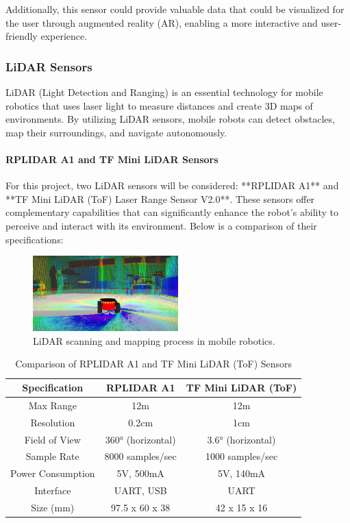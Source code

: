 Additionally, this sensor could provide valuable data that could be visualized for the user through augmented reality (AR), enabling a more interactive and user-friendly experience.

\subsubsection{LiDAR Sensors}
LiDAR (Light Detection and Ranging) is an essential technology for mobile robotics that uses laser light to measure distances and create 3D maps of environments. By utilizing LiDAR sensors, mobile robots can detect obstacles, map their surroundings, and navigate autonomously.

\paragraph{RPLIDAR A1 and TF Mini LiDAR Sensors}
For this project, two LiDAR sensors will be considered: **RPLIDAR A1** and **TF Mini LiDAR (ToF) Laser Range Sensor V2.0**. These sensors offer complementary capabilities that can significantly enhance the robot's ability to perceive and interact with its environment. Below is a comparison of their specifications:

\begin{figure}[h]
    \centering
    \includegraphics[width=0.5\textwidth]{ch2/figs/lidar_graphic.png} %
    \caption{LiDAR scanning and mapping process in mobile robotics.}
    \label{fig:lidar_graphic}
\end{figure}

\begin{table}[h]
\centering
\caption{Comparison of RPLIDAR A1 and TF Mini LiDAR (ToF) Sensors}
\begin{tabular}{|c|c|c|}
\hline
\textbf{Specification} & \textbf{RPLIDAR A1} & \textbf{TF Mini LiDAR (ToF)} \\ \hline
Max Range & 12m & 12m \\ \hline
Resolution & 0.2cm & 1cm \\ \hline
Field of View & 360° (horizontal) & 3.6° (horizontal) \\ \hline
Sample Rate & 8000 samples/sec & 1000 samples/sec \\ \hline
Power Consumption & 5V, 500mA & 5V, 140mA \\ \hline
Interface & UART, USB & UART \\ \hline
Size (mm) & 97.5 x 60 x 38 & 42 x 15 x 16 \\ \hline
\end{tabular}
\label{tab:lidar_comparison}
\end{table}


